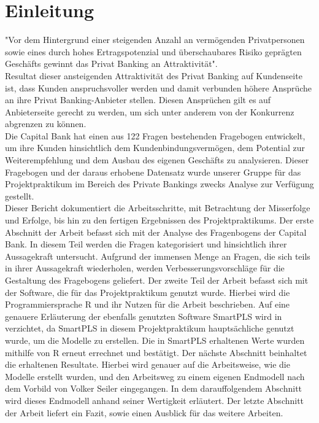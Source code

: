 \documentclass{article}\usepackage[]{graphicx}\usepackage[]{color}
\begin{document}
\section{Einleitung}%
"Vor dem Hintergrund einer steigenden Anzahl an vermögenden Privatpersonen sowie eines durch hohes Ertragspotenzial und überschaubares Risiko geprägten Geschäfts gewinnt das Privat Banking an Attraktivität".\cite{seiler2009kundenzufriedenheit} \\Resultat dieser ansteigenden Attraktivität des Privat Banking auf Kundenseite ist, dass Kunden anspruchsvoller werden und damit verbunden höhere Ansprüche an ihre Privat Banking-Anbieter stellen.\cite{seiler2009kundenzufriedenheit}
Diesen Ansprüchen gilt es auf Anbieterseite gerecht zu werden, um sich unter anderem von der Konkurrenz abgrenzen zu können.\\
Die Capital Bank hat einen aus 122 Fragen bestehenden Fragebogen entwickelt, um ihre Kunden hinsichtlich dem Kundenbindungsvermögen, dem Potential zur Weiterempfehlung und dem Ausbau des eigenen Geschäfts zu analysieren.
Dieser Fragebogen und der daraus erhobene Datensatz wurde unserer Gruppe für das Projektpraktikum im Bereich des Private Bankings zwecks Analyse zur Verfügung gestellt. \\
Dieser Bericht dokumentiert die Arbeitsschritte, mit Betrachtung der Misserfolge und Erfolge, bis hin zu den fertigen Ergebnissen des Projektpraktikums. Der erste Abschnitt der Arbeit befasst sich mit der Analyse des Fragenbogens der Capital Bank. In diesem Teil werden die Fragen kategorisiert und hinsichtlich ihrer Aussagekraft untersucht. Aufgrund der immensen Menge an Fragen, die sich teils in ihrer Aussagekraft wiederholen, werden Verbesserungsvorschläge für die Gestaltung des Fragebogens geliefert. Der zweite Teil der Arbeit befasst sich mit der Software, die für das Projektpraktikum genutzt wurde. Hierbei wird die Programmiersprache R und ihr Nutzen für die Arbeit beschrieben. Auf eine genauere Erläuterung der ebenfalls genutzten Software SmartPLS wird in verzichtet, da SmartPLS in diesem Projektpraktikum hauptsächliche genutzt wurde, um die Modelle zu erstellen. Die in SmartPLS erhaltenen Werte wurden mithilfe von R erneut errechnet und bestätigt. Der nächste Abschnitt beinhaltet die erhaltenen Resultate. Hierbei wird genauer auf die Arbeitsweise, wie die Modelle erstellt wurden, und den Arbeitsweg zu einem eigenen Endmodell nach dem Vorbild von Volker Seiler eingegangen. In dem darauffolgendem Abschnitt wird dieses Endmodell anhand seiner Wertigkeit erläutert. Der letzte Abschnitt der Arbeit liefert ein Fazit, sowie einen Ausblick für das weitere Arbeiten.
\end{document}
